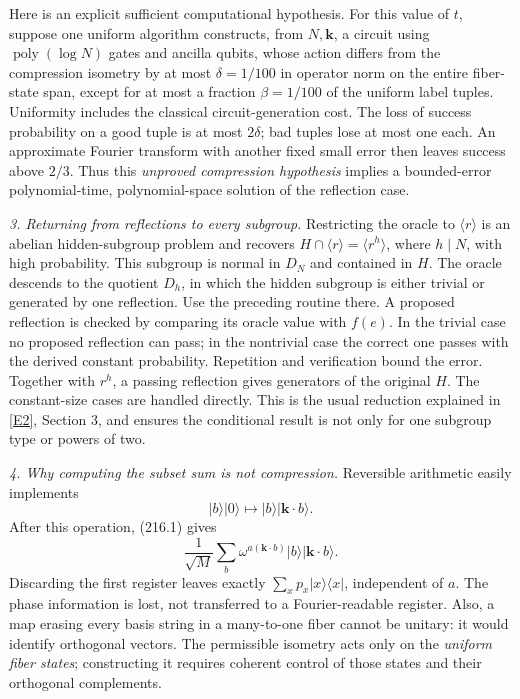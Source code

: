 \documentclass[11pt,a4paper]{article}
\newcommand{\eref}[2]{\hyperlink{extra:#1:#2}{[E#2]}}
\begin{document}
Here is an explicit sufficient computational hypothesis. For this value
of $t$, suppose one uniform algorithm constructs, from $N,\mathbf k$,
a circuit using $\operatorname{poly}(\log N)$ gates and ancilla qubits,
whose action differs from the compression isometry by at most
$\delta=1/100$ in operator norm on the entire fiber-state span, except
for at most a fraction $\beta=1/100$ of the uniform label tuples.
Uniformity includes the classical circuit-generation cost. The loss of
success probability on a good tuple is at most $2\delta$; bad tuples lose
at most one each. An approximate Fourier transform with another fixed
small error then leaves success above $2/3$. Thus this \emph{unproved
compression hypothesis} implies a bounded-error polynomial-time,
polynomial-space solution of the reflection case.

\textit{3. Returning from reflections to every subgroup.}
Restricting the oracle to $\langle r\rangle$ is an abelian hidden-subgroup
problem and recovers $H\cap\langle r\rangle=\langle r^h\rangle$, where
$h\mid N$, with high probability. This subgroup is normal in $D_N$ and
contained in $H$. The oracle descends to the quotient $D_h$, in which
the hidden subgroup is either trivial or generated by one reflection.
Use the preceding routine there. A proposed reflection is checked by
comparing its oracle value with $f(e)$. In the trivial case no proposed
reflection can pass; in the nontrivial case the correct one passes with
the derived constant probability. Repetition and verification bound the
error. Together with $r^h$, a passing reflection gives generators of the
original $H$. The constant-size cases are handled directly. This is the
usual reduction explained in \eref{30006794}{2}, Section 3, and ensures the
conditional result is not only for one subgroup type or powers of two.

\textit{4. Why computing the subset sum is not compression.}
Reversible arithmetic easily implements
\[
 |b\rangle|0\rangle\longmapsto|b\rangle|\mathbf k\cdot b\rangle.
\]
After this operation, (216.1) gives
\[
 \frac1{\sqrt M}\sum_b\omega^{a(\mathbf k\cdot b)}
              |b\rangle|\mathbf k\cdot b\rangle.             \tag{216.5}
\]
Discarding the first register leaves exactly
$\sum_xp_x|x\rangle\langle x|$, independent of $a$.
The phase information is lost, not transferred to a Fourier-readable
register. Also, a map erasing every basis string in a many-to-one fiber
cannot be unitary: it would identify orthogonal vectors. The permissible
isometry acts only on the \emph{uniform fiber states}; constructing it
requires coherent control of those states and their orthogonal complements.
\end{document}
